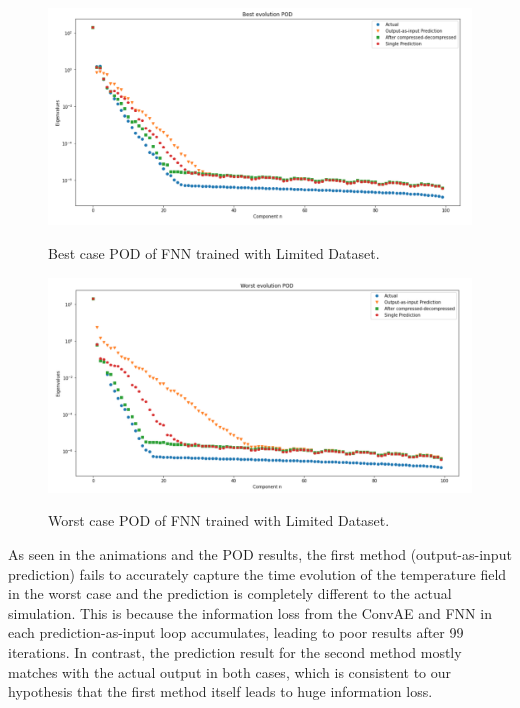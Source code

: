\begin{figure}[H]
    \caption{Best case POD of FNN trained with Limited Dataset.}
    \includegraphics[scale=0.5]{figures/mantle_convection_images/limited_dataset/FNN_Best_POD.png}
    \label{figure:FNN_limited_best_POD}
\end{figure}

\begin{figure}[H]
    \caption{Worst case POD of FNN trained with Limited Dataset.}
    \includegraphics[scale=0.5]{figures/mantle_convection_images/limited_dataset/FNN_Worst_POD.png}
    \label{figure:FNN_limited_worst_POD}
\end{figure}

As seen in the animations and the POD results, the first method (output-as-input prediction) fails to accurately capture the time evolution of the temperature field in the worst case and the prediction is completely different to the actual simulation. This is because the information loss from the ConvAE and FNN in each prediction-as-input loop accumulates, leading to poor results after 99 iterations. In contrast, the prediction result for the second method mostly matches with the actual output in both cases, which is consistent to our hypothesis that the first method itself leads to huge information loss.

